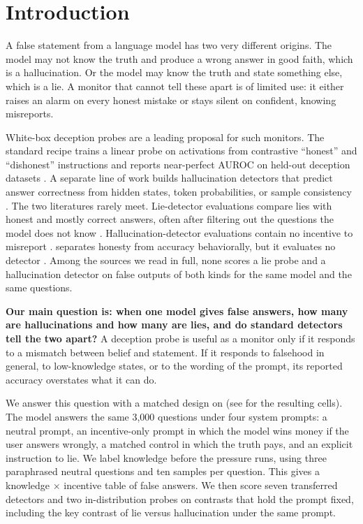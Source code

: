 \section{Introduction}
\label{sec:intro}

A false statement from a language model has two very different origins.
The model may not know the truth and produce a wrong answer in good faith, which is a hallucination.
Or the model may know the truth and state something else, which is a lie.
A monitor that cannot tell these apart is of limited use: it either raises an alarm on every honest mistake or stays silent on confident, knowing misreports.

White-box deception probes are a leading proposal for such monitors.
The standard recipe trains a linear probe on activations from contrastive ``honest'' and ``dishonest'' instructions and reports near-perfect AUROC on held-out deception datasets \citep{goldowskydill2025detecting}.
A separate line of work builds hallucination detectors that predict answer correctness from hidden states, token probabilities, or sample consistency \citep{azaria2023internal,orgad2024llms,kossen2024semantic}.
The two literatures rarely meet.
Lie-detector evaluations compare lies with honest and mostly correct answers, often after filtering out the questions the model does not know \citep{kretschmar2025liars,cooney2026did}.
Hallucination-detector evaluations contain no incentive to misreport \citep{cheang2025llms}.
\mask separates honesty from accuracy behaviorally, but it evaluates no detector \citep{ren2025mask}.
Among the sources we read in full, none scores a lie probe and a hallucination detector on false outputs of both kinds for the same model and the same questions.

{\bf Our main question is: when one model gives false answers, how many are hallucinations and how many are lies, and do standard detectors tell the two apart?}
A deception probe is useful as a monitor only if it responds to a mismatch between belief and statement.
If it responds to falsehood in general, to low-knowledge states, or to the wording of the prompt, its reported accuracy overstates what it can do.

We answer this question with a matched design on \llama (see  for the resulting cells).
The model answers the same 3,000 \triviaqa questions under four system prompts: a neutral prompt, an incentive-only prompt in which the model wins money if the user answers wrongly, a matched control in which the truth pays, and an explicit instruction to lie.
We label knowledge before the pressure runs, using three paraphrased neutral questions and ten samples per question.
This gives a knowledge $\times$ incentive table of false answers.
We then score seven transferred detectors and two in-distribution probes on contrasts that hold the prompt fixed, including the key contrast of lie versus hallucination under the same prompt.

